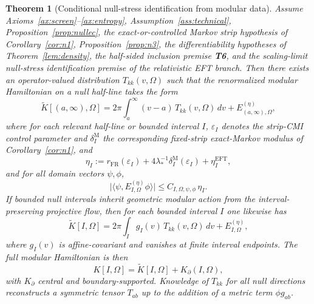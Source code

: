 \documentclass[11pt]{article}
\newtheorem{theorem}{Theorem}[section]
\begin{document}
\begin{theorem}[Conditional null-stress identification from modular data]\label{thm:stress}
Assume Axioms~\ref{ax:screen}--\ref{ax:entropy}, Assumption~\ref{ass:technical}, Proposition~\ref{prop:nullec}, the exact-or-controlled Markov strip hypothesis of Corollary~\ref{cor:n1}, Proposition~\ref{prop:n3}, the differentiability hypotheses of Theorem~\ref{lem:density}, the half-sided inclusion premise \textbf{T6}, and the scaling-limit null-stress identification premise of the relativistic EFT branch. Then there exists an operator-valued distribution \(T_{kk}(v,\Omega)\) such that the renormalized modular Hamiltonian on a null half-line takes the form
\[
\widetilde K[(a,\infty),\Omega]
=
2\pi\int_a^\infty (v-a)\,T_{kk}(v,\Omega)\,dv
+
E^{(\eta)}_{(a,\infty),\Omega},
\]
where for each relevant half-line or bounded interval \(I\), \(\varepsilon_I\) denotes the strip-CMI control parameter and \(\delta^{\mathrm M}_{I}\) the corresponding fixed-strip exact-Markov modulus of Corollary~\ref{cor:n1}, and
\[
\eta_I
:=
r_{\mathrm{FR}}(\varepsilon_I)
+
4\lambda_\ast^{-1}\delta^{\mathrm M}_{I}(\varepsilon_I)
+
\eta_I^{\mathrm{EFT}},
\]
and for all domain vectors \(\psi,\phi\),
\[
\bigl|\langle\psi,E^{(\eta)}_{I,\Omega}\phi\rangle\bigr|
\le
C_{I,\Omega,\psi,\phi}\,\eta_I.
\]
If bounded null intervals inherit geometric modular action from the interval-preserving projective flow, then for each bounded interval \(I\) one likewise has
\[
\widetilde K[I,\Omega]
=
2\pi\int_I g_I(v)\,T_{kk}(v,\Omega)\,dv
+
E^{(\eta)}_{I,\Omega},
\]
where \(g_I(v)\) is affine-covariant and vanishes at finite interval endpoints. The full modular Hamiltonian is then
\[
K[I,\Omega]
=
\widetilde K[I,\Omega]+K_\partial(I,\Omega),
\]
with \(K_\partial\) central and boundary-supported. Knowledge of \(T_{kk}\) for all null directions reconstructs a symmetric tensor \(T_{ab}\) up to the addition of a metric term \(\phi g_{ab}\).
\end{theorem}
\end{document}
